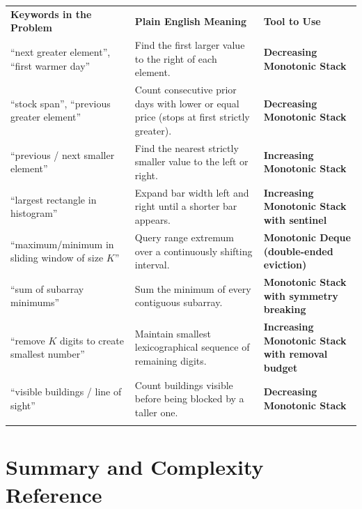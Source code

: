 \documentclass[11pt,a4paper]{article}
\theoremstyle{definition}
\begin{document}
\begin{center}
\begingroup
\small
{}
\begin{tabularx}{\textwidth}{>{\raggedright\arraybackslash}p{4.3cm} >{\raggedright\arraybackslash}X >{\raggedright\arraybackslash\bfseries}p{4.0cm}}
\arrayrulecolor{primaryblue}\toprule[1.2pt]
\rowcolor{primaryblue!10}
\textcolor{primaryblue}{\textbf{Keywords in the Problem}} & \textcolor{primaryblue}{\textbf{Plain English Meaning}} & \textcolor{primaryblue}{\textbf{Tool to Use}} \\
\arrayrulecolor{codeframe}\midrule[0.6pt]
``next greater element'', ``first warmer day'' & Find the first larger value to the right of each element. & Decreasing Monotonic Stack \\
``stock span'', ``previous greater element'' & Count consecutive prior days with lower or equal price (stops at first strictly greater). & Decreasing Monotonic Stack \\
``previous / next smaller element'' & Find the nearest strictly smaller value to the left or right. & Increasing Monotonic Stack \\
``largest rectangle in histogram'' & Expand bar width left and right until a shorter bar appears. & Increasing Monotonic Stack with sentinel \\
``maximum/minimum in sliding window of size $K$'' & Query range extremum over a continuously shifting interval. & Monotonic Deque (double-ended eviction) \\
``sum of subarray minimums'' & Sum the minimum of every contiguous subarray. & Monotonic Stack with symmetry breaking \\
``remove $K$ digits to create smallest number'' & Maintain smallest lexicographical sequence of remaining digits. & Increasing Monotonic Stack with removal budget \\
``visible buildings / line of sight'' & Count buildings visible before being blocked by a taller one. & Decreasing Monotonic Stack \\
\arrayrulecolor{primaryblue}\bottomrule[1.2pt]
\end{tabularx}
\endgroup
\end{center}

\section{Summary and Complexity Reference}
\end{document}
